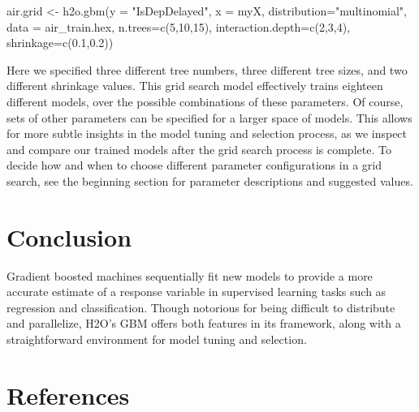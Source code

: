 \documentclass[11pt]{article}
\begin{document}
\begin{spverbatim}

air.grid <- h2o.gbm(y = "IsDepDelayed", x = myX, 
                   distribution="multinomial", 
                   data = air_train.hex, n.trees=c(5,10,15), 
                   interaction.depth=c(2,3,4), 
                   shrinkage=c(0.1,0.2))

\end{spverbatim}
\noindent
Here we specified three different tree numbers, three different tree sizes, and two different shrinkage values. This grid search model effectively trains eighteen different models, over the possible combinations of these parameters. Of course, sets of other parameters can be specified for a larger space of models. This allows for more subtle insights in the model tuning and selection process, as we inspect and compare our trained models after the grid search process is complete. To decide how and when to choose different parameter configurations in a grid search, see the beginning section for parameter descriptions and suggested values.


\section{Conclusion}

Gradient boosted machines sequentially fit new models to provide a more accurate estimate of a response variable in supervised learning tasks such as regression and classification. Though notorious for being difficult to distribute and parallelize, H2O's GBM offers both features in its framework, along with a straightforward environment for model tuning and selection. 

\newpage

\section{References}
\end{document}

